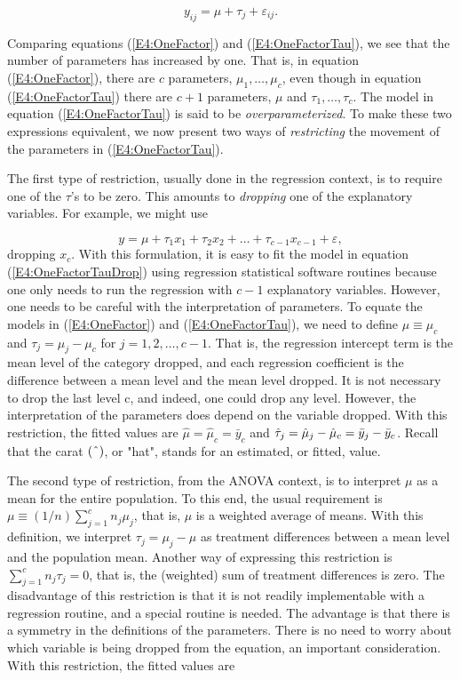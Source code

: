 \begin{equation*}
y_{ij}=\mu +\tau_{j} + \varepsilon_{ij}.
\end{equation*}

Comparing equations (\ref{E4:OneFactor}) and
(\ref{E4:OneFactorTau}), we see that the number of parameters
has increased by one. That is, in equation (\ref{E4:OneFactor}), there are $c$ parameters, $%
\mu_1,\ldots ,\mu_c$, even though in equation
(\ref{E4:OneFactorTau}) there are $c+1$ parameters, $\mu $ and $\tau
_1,\ldots ,\tau_c$. The model in equation (\ref{E4:OneFactorTau}) is
said to be \textit{overparameterized}. To make these two expressions
equivalent, we now present two ways of \textit{restricting} the
movement of the parameters in (\ref{E4:OneFactorTau}).

The first type of restriction, usually done in the regression context, is to
require one of the $\tau $'s to be zero. This amounts to \textit{dropping}
one of the explanatory variables. For example, we might use

\begin{equation}  \label{E4:OneFactorTauDrop}
y=\mu +\tau_1x_1+\tau_2x_2+\ldots +\tau _{c-1}x_{c-1}+\varepsilon,
\end{equation}%
dropping $x_{c}$. With this formulation, it is easy to fit the model
in equation (\ref{E4:OneFactorTauDrop}) using regression statistical
software routines because one only needs to run the regression with
$c-1$ explanatory variables. However, one needs to be careful with
the interpretation of parameters. To equate the models in
(\ref{E4:OneFactor}) and (\ref{E4:OneFactorTau}), we need to define
$\mu \equiv \mu_c$ and $\tau_{j}=\mu_{j}-\mu_c$ for $j=1,2,\ldots
,c-1$. That is, the regression intercept term is the mean level of
the category dropped, and each regression coefficient is the
difference between a mean level and the mean level dropped. It is
not necessary to drop the last level c, and indeed, one could drop
any level. However, the interpretation of the parameters does depend
on the variable dropped. With this restriction, the fitted values
are
$\hat{\mu}=\hat{\mu}_{c}=\bar{y}_{c}$ and $\hat{\tau}_{j}=\hat{\mu}_{j}-\hat{%
\mu}_{c}=\bar{y}_{j}-\bar{y}_{c}$. Recall that the carat $(\symbol{94})$, or
"hat", stands for an estimated, or fitted, value.

The second type of restriction, from the ANOVA context, is to
interpret $\mu $ as a mean for the entire population. To this end,
the usual requirement is $\mu \equiv
(1/n)\sum_{j=1}^{c}n_{j}\mu_{j}$, that is, $\mu $ is a weighted
average of means. With this definition, we interpret $\tau_{j}=\mu
_{j}-\mu $ as treatment differences between a mean level and the
population mean. Another way of expressing this restriction is
$\sum_{j=1}^{c}n_{j}\tau_{j}=0 $, that is, the (weighted) sum of
treatment differences is zero. The disadvantage of this restriction
is that it is not readily implementable with a regression routine,
and a special routine is needed. The advantage is that there is a
symmetry in the definitions of the parameters. There is no need to
worry about which variable is being dropped from the equation, an
important consideration. With this restriction, the fitted values
are

